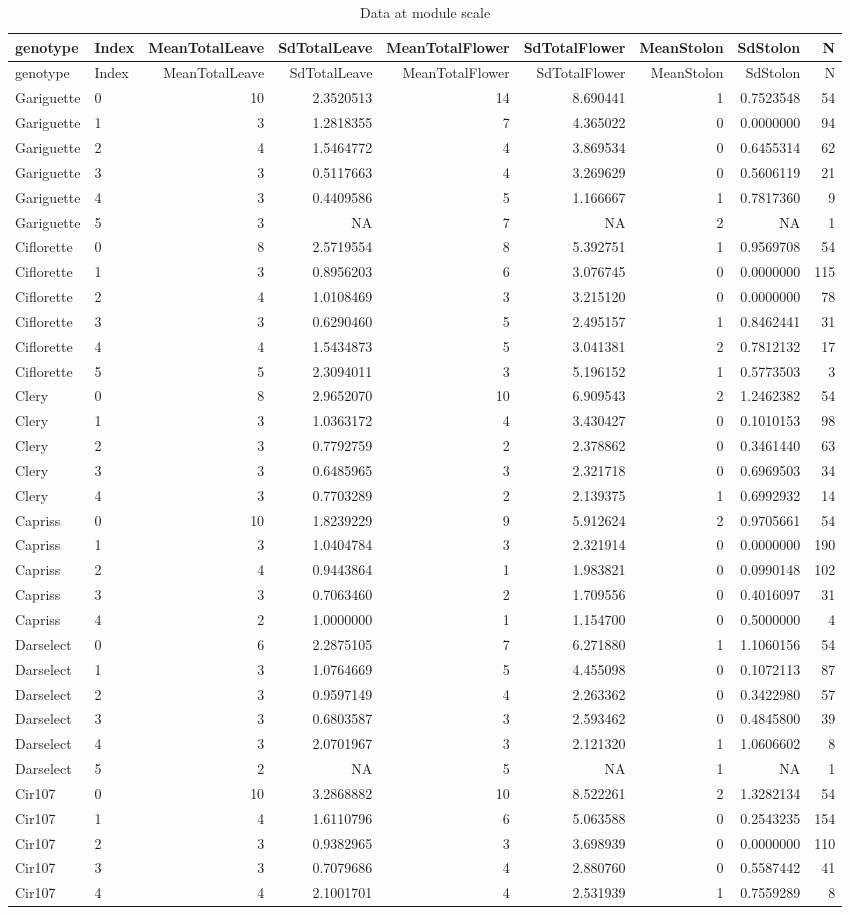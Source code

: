 \documentclass[]{article}
\begin{document}
\begin{longtable}[]{@{}llrrrrrrr@{}}
\caption{Data at module scale}\tabularnewline
\toprule
genotype & Index & MeanTotalLeave & SdTotalLeave & MeanTotalFlower &
SdTotalFlower & MeanStolon & SdStolon & N\tabularnewline
\midrule
\endfirsthead
\toprule
genotype & Index & MeanTotalLeave & SdTotalLeave & MeanTotalFlower &
SdTotalFlower & MeanStolon & SdStolon & N\tabularnewline
\midrule
\endhead
Gariguette & 0 & 10 & 2.3520513 & 14 & 8.690441 & 1 & 0.7523548 &
54\tabularnewline
Gariguette & 1 & 3 & 1.2818355 & 7 & 4.365022 & 0 & 0.0000000 &
94\tabularnewline
Gariguette & 2 & 4 & 1.5464772 & 4 & 3.869534 & 0 & 0.6455314 &
62\tabularnewline
Gariguette & 3 & 3 & 0.5117663 & 4 & 3.269629 & 0 & 0.5606119 &
21\tabularnewline
Gariguette & 4 & 3 & 0.4409586 & 5 & 1.166667 & 1 & 0.7817360 &
9\tabularnewline
Gariguette & 5 & 3 & NA & 7 & NA & 2 & NA & 1\tabularnewline
Ciflorette & 0 & 8 & 2.5719554 & 8 & 5.392751 & 1 & 0.9569708 &
54\tabularnewline
Ciflorette & 1 & 3 & 0.8956203 & 6 & 3.076745 & 0 & 0.0000000 &
115\tabularnewline
Ciflorette & 2 & 4 & 1.0108469 & 3 & 3.215120 & 0 & 0.0000000 &
78\tabularnewline
Ciflorette & 3 & 3 & 0.6290460 & 5 & 2.495157 & 1 & 0.8462441 &
31\tabularnewline
Ciflorette & 4 & 4 & 1.5434873 & 5 & 3.041381 & 2 & 0.7812132 &
17\tabularnewline
Ciflorette & 5 & 5 & 2.3094011 & 3 & 5.196152 & 1 & 0.5773503 &
3\tabularnewline
Clery & 0 & 8 & 2.9652070 & 10 & 6.909543 & 2 & 1.2462382 &
54\tabularnewline
Clery & 1 & 3 & 1.0363172 & 4 & 3.430427 & 0 & 0.1010153 &
98\tabularnewline
Clery & 2 & 3 & 0.7792759 & 2 & 2.378862 & 0 & 0.3461440 &
63\tabularnewline
Clery & 3 & 3 & 0.6485965 & 3 & 2.321718 & 0 & 0.6969503 &
34\tabularnewline
Clery & 4 & 3 & 0.7703289 & 2 & 2.139375 & 1 & 0.6992932 &
14\tabularnewline
Capriss & 0 & 10 & 1.8239229 & 9 & 5.912624 & 2 & 0.9705661 &
54\tabularnewline
Capriss & 1 & 3 & 1.0404784 & 3 & 2.321914 & 0 & 0.0000000 &
190\tabularnewline
Capriss & 2 & 4 & 0.9443864 & 1 & 1.983821 & 0 & 0.0990148 &
102\tabularnewline
Capriss & 3 & 3 & 0.7063460 & 2 & 1.709556 & 0 & 0.4016097 &
31\tabularnewline
Capriss & 4 & 2 & 1.0000000 & 1 & 1.154700 & 0 & 0.5000000 &
4\tabularnewline
Darselect & 0 & 6 & 2.2875105 & 7 & 6.271880 & 1 & 1.1060156 &
54\tabularnewline
Darselect & 1 & 3 & 1.0764669 & 5 & 4.455098 & 0 & 0.1072113 &
87\tabularnewline
Darselect & 2 & 3 & 0.9597149 & 4 & 2.263362 & 0 & 0.3422980 &
57\tabularnewline
Darselect & 3 & 3 & 0.6803587 & 3 & 2.593462 & 0 & 0.4845800 &
39\tabularnewline
Darselect & 4 & 3 & 2.0701967 & 3 & 2.121320 & 1 & 1.0606602 &
8\tabularnewline
Darselect & 5 & 2 & NA & 5 & NA & 1 & NA & 1\tabularnewline
Cir107 & 0 & 10 & 3.2868882 & 10 & 8.522261 & 2 & 1.3282134 &
54\tabularnewline
Cir107 & 1 & 4 & 1.6110796 & 6 & 5.063588 & 0 & 0.2543235 &
154\tabularnewline
Cir107 & 2 & 3 & 0.9382965 & 3 & 3.698939 & 0 & 0.0000000 &
110\tabularnewline
Cir107 & 3 & 3 & 0.7079686 & 4 & 2.880760 & 0 & 0.5587442 &
41\tabularnewline
Cir107 & 4 & 4 & 2.1001701 & 4 & 2.531939 & 1 & 0.7559289 &
8\tabularnewline
\bottomrule
\end{longtable}
\end{document}
